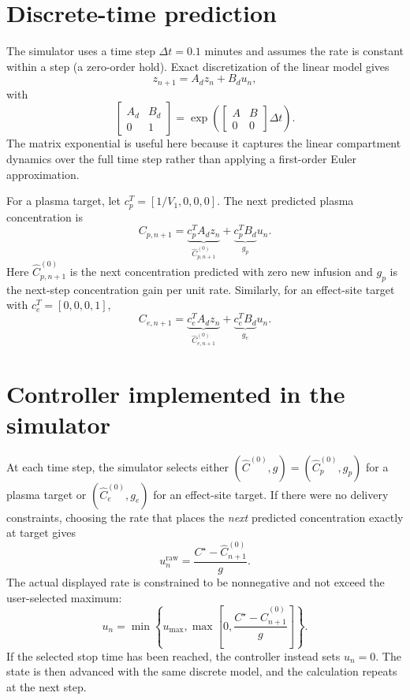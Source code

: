 \documentclass[11pt]{article}
\begin{document}
\section{Discrete-time prediction}

The simulator uses a time step $\Delta t=0.1$ minutes and assumes the rate is constant within a step (a zero-order hold). Exact discretization of the linear model gives
\begin{equation}
 z_{n+1}=A_dz_n+B_du_n,
\end{equation}
with
\begin{equation}
 \begin{bmatrix}A_d & B_d\\0&1\end{bmatrix}
 =\exp\left(
 \begin{bmatrix}A&B\\0&0\end{bmatrix}\Delta t
 \right).
\end{equation}
The matrix exponential is useful here because it captures the linear compartment dynamics over the full time step rather than applying a first-order Euler approximation.

For a plasma target, let $c_p^T=[1/V_1,0,0,0]$. The next predicted plasma concentration is
\begin{equation}
 C_{p,n+1}=\underbrace{c_p^TA_dz_n}_{\widehat{C}_{p,n+1}^{(0)}}+
 \underbrace{c_p^TB_d}_{g_p}u_n.
\end{equation}
Here $\widehat{C}_{p,n+1}^{(0)}$ is the next concentration predicted with zero new infusion and $g_p$ is the next-step concentration gain per unit rate. Similarly, for an effect-site target with $c_e^T=[0,0,0,1]$,
\begin{equation}
 C_{e,n+1}=\underbrace{c_e^TA_dz_n}_{\widehat{C}_{e,n+1}^{(0)}}+
 \underbrace{c_e^TB_d}_{g_e}u_n.
\end{equation}

\section{Controller implemented in the simulator}

At each time step, the simulator selects either $(\widehat{C}^{(0)},g)=(\widehat{C}_{p}^{(0)},g_p)$ for a plasma target or $(\widehat{C}_{e}^{(0)},g_e)$ for an effect-site target. If there were no delivery constraints, choosing the rate that places the \emph{next} predicted concentration exactly at target gives
\begin{equation}
 u_n^{\mathrm{raw}}=\frac{C^\star-\widehat{C}_{n+1}^{(0)}}{g}.
\end{equation}
The actual displayed rate is constrained to be nonnegative and not exceed the user-selected maximum:
\begin{equation}
 \boxed{
 u_n=\min\left\{u_{\max},\max\left[0,\frac{C^\star-\widehat{C}_{n+1}^{(0)}}{g}\right]\right\}.}
\end{equation}
If the selected stop time has been reached, the controller instead sets $u_n=0$. The state is then advanced with the same discrete model, and the calculation repeats at the next step.
\end{document}
